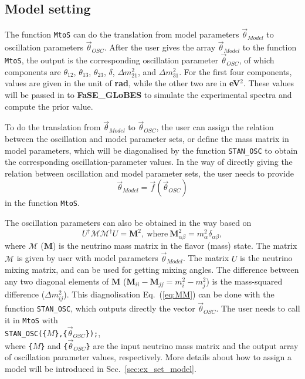\documentclass[aps,prd,nofootinbib,preprint]{revtex4}
\begin{document}
\subsection{Model setting}\label{sec:model_set}

The function \texttt{MtoS} can do the {\color{blue}translation} from model parameters $\vec{\theta}_{Model}$ to oscillation parameters $\vec{\theta}_{OSC}$. After the user gives the array $\vec{\theta}_{Model}$ to the function \texttt{MtoS}, the output is the corresponding oscillation parameter $\vec{\theta}_{OSC}$, of which components are $\theta_{12}$, $\theta_{13}$, $\theta_{23}$, $\delta$, $\Delta m_{21}^2$, and $\Delta m_{31}^2$. For the first four components, values are given in the unit of \textbf{rad}, while the other two are in \textbf{eV$^2$}. These values will be passed in to \textbf{FaSE\_GLoBES} to simulate 
the experimental spectra and compute the prior value.


To do the translation from $\vec{\theta}_{Model}$ to $\vec{\theta}_{OSC}$, the user can assign the relation between the oscillation and model parameter sets, or define the mass matrix in model parameters, which will be diagonalised by the function \texttt{STAN\_OSC} to obtain the corresponding oscillation-parameter values. 
In the way of directly giving the relation between oscillation and model parameter sets, the user needs to provide
\begin{equation}\label{eq:modelofOSC}
\vec{\theta}_{Model}=\vec{f}(\vec{\theta}_{OSC})
\end{equation}
 in the function \texttt{MtoS}.
%

The oscillation parameters can also be obtained in the way based on
\begin{equation}\label{eq:MM}
U^\dagger\mathcal{M}\mathcal{M}^\dagger U = \mathbf{M}^2,~\text{where}~\mathbf{M}^2_{\alpha\beta}=m_\alpha^2\delta_{\alpha\beta},
\end{equation}
where $\mathcal{M}$ ($\mathbf{M}$) is the neutrino mass matrix in the flavor (mass) state. The matrix $\mathcal{M}$ is given by user with model parameters $\vec{\theta}_{Model}$. The matrix $U$ is the neutrino mixing matrix, and can be used for getting mixing angles. The difference between any two diagonal elements of $\textbf{M}$ ($\textbf{M}_{ii}-\textbf{M}_{jj}=m_i^2-m_j^2$) is the mass-squared difference ($\Delta m_{ij}^2$). This diagnolisation Eq.~(\ref{eq:MM}) can be done with the function \texttt{STAN\_OSC}, which outputs directly the vector $\vec{\theta}_{OSC}$. 
The user needs to call it in \texttt{MtoS} with\vspace{0.2cm}\\
\texttt{STAN\_OSC(\{}$M$\texttt{\},\{}$\vec{\theta}_{OSC}$\texttt{\});},\\
where \texttt{\{}$M$\texttt{\}} and \texttt{\{}$\vec{\theta}_{OSC}$\texttt{\}} are the input neutrino mass matrix and the output array of oscillation parameter values, respectively. More details about how to assign a model will be introduced in Sec.~\ref{sec:ex_set_model}.
\end{document}
